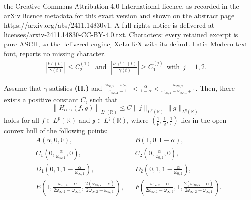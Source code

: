 \documentclass[10pt,a4paper]{amsart}
\begin{document}
the Creative Commons Attribution 4.0 International licence, as recorded in the arXiv licence metadata for this exact version and shown on the abstract page https://arxiv.org/abs/2411.14830v1. A full rights notice is delivered at licenses/arxiv-2411.14830-CC-BY-4.0.txt. Characters: every retained excerpt is pure ASCII, so the delivered engine, XeLaTeX with its default Latin Modern text font, reports no missing character.
\begin{align}\label{eq:1.1}
 \left|\frac{t\gamma'(t)}{\gamma(t)}\right|\leq C^{(1)}_2~~~\textrm{and}~~~\left|\frac{t^j\gamma^{(j)}(t)}{\gamma(t)}\right|\geq C^{(j)}_{1}~~\textrm{with}~~j=1,2.
\end{align}

\begin{theorem}\label{maintheorem}
Assume that $\gamma$ satisfies {\bf(H.)} and $\frac{\omega_{\infty,2}-\omega_{\infty,1}}{\omega_{\infty,2}-1}<\frac{\alpha}{1-\alpha}<\frac{\omega_{\infty,2}}{\omega_{\infty,2}-\omega_{\infty,1}+1}$. Then, there exists a positive constant $C$, such that
$$\left\|H_{\alpha,\gamma}(f,g)\right\|_{L^{r}(\mathbb{R})}\leq C \|f\|_{L^{p}(\mathbb{R})}\|g\|_{L^{q}(\mathbb{R})}$$
holds for all $f\in L^{p}(\mathbb{R})$ and $g\in L^{q}(\mathbb{R})$, where $(\frac{1}{p},\frac{1}{q},\frac{1}{r})$ lies in the open convex hull of the following points:
\begin{align*}
&A\left(\alpha,0,0\right),&&B\left(1,0,1-\alpha\right),\\
&C_1\left(0,\frac{\alpha}{\omega_{\infty,1}},0\right),&&C_2\left(0,\frac{\alpha}{\omega_{0,2}},0\right),\\
&D_1\left(0,1,1-\frac{\alpha}{\omega_{\infty,1}}\right),&&D_2\left(0,1,1-\frac{\alpha}{\omega_{0,2}}\right),\\
&E\left(1, \frac{\omega_{\infty,2}-\alpha}{2\omega_{\infty,2}-\omega_{\infty,1} }, \frac{2(\omega_{\infty,2}-\alpha)}{2\omega_{\infty,2}-\omega_{\infty,1} }\right),&&F\left(\frac{\omega_{\infty,2}-\alpha}{2\omega_{\infty,2}-\omega_{\infty,1} }, 1, \frac{2(\omega_{\infty,2}-\alpha)}{2\omega_{\infty,2}-\omega_{\infty,1} }\right).
\end{align*}
\end{theorem}
\end{document}
